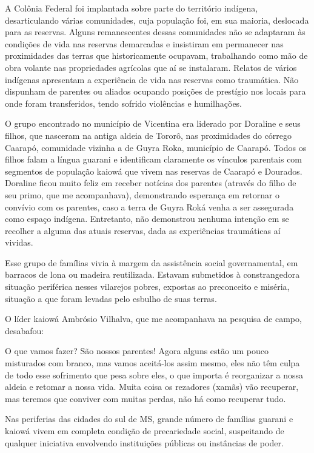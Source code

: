A Colônia Federal foi implantada sobre parte do território indígena,
desarticulando várias comunidades, cuja população foi, em sua maioria,
deslocada para as reservas. Alguns remanescentes dessas comunidades não
se adaptaram às condições de vida nas reservas demarcadas e insistiram
em permanecer nas proximidades das terras que historicamente ocupavam,
trabalhando como mão de obra volante nas propriedades agrícolas que aí
se instalaram. Relatos de vários indígenas apresentam a experiência de
vida nas reservas como traumática. Não dispunham de parentes ou aliados
ocupando posições de prestígio nos locais para onde foram transferidos,
tendo sofrido violências e humilhações.

O grupo encontrado no município de Vicentina era liderado por Doraline e
seus filhos, que nasceram na antiga aldeia de Tororô, nas proximidades
do córrego Caarapó, comunidade vizinha a de Guyra Roka, município de
Caarapó. Todos os filhos falam a língua guarani e identificam
claramente os vínculos parentais com segmentos de população kaiowá que
vivem nas reservas de Caarapó e Dourados. Doraline ficou muito feliz em
receber notícias dos parentes (através do filho de seu primo, que me
acompanhava), demonstrando esperança em retornar o convívio com os
parentes, caso a terra de Guyra Roká venha a ser assegurada como espaço
indígena. Entretanto, não demonstrou nenhuma intenção em se recolher a
alguma das atuais reservas, dada as experiências traumáticas aí
vividas.

Esse grupo de famílias vivia à margem da assistência social
governamental, em barracos de lona ou madeira reutilizada. Estavam
submetidos à constrangedora situação periférica nesses vilarejos
pobres, expostas ao preconceito e miséria, situação a que foram levadas
pelo esbulho de suas terras.

O líder kaiowá Ambrósio Vilhalva, que me acompanhava na pesquisa de
campo, desabafou:

O que vamos fazer? São nossos parentes! Agora alguns estão um pouco
misturados com branco, mas vamos aceitá-los assim mesmo, eles não têm
culpa de todo esse sofrimento que pesa sobre eles, o que importa é
reorganizar a nossa aldeia e retomar a nossa vida. Muita coisa os
rezadores (xamãs) vão recuperar, mas teremos que conviver com muitas
perdas, não há como recuperar tudo.

Nas periferias das cidades do sul de MS, grande número de famílias
guarani e kaiowá vivem em completa condição de precariedade social,
suspeitando de qualquer iniciativa envolvendo instituições públicas ou
instâncias de poder. 

